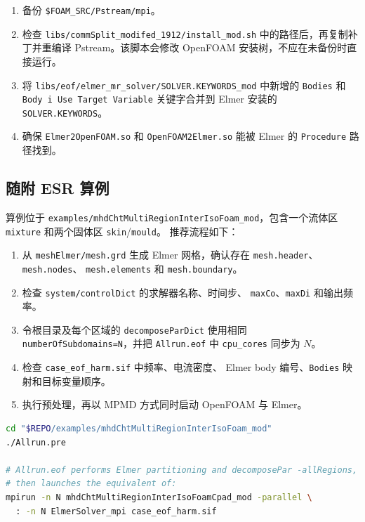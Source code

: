\documentclass[11pt,a4paper]{article}
\begin{document}
\begin{enumerate}
    \item 备份 \texttt{\$FOAM\_SRC/Pstream/mpi}。
    \item 检查 \texttt{libs/commSplit\_modifed\_1912/install\_mod.sh}
    中的路径后，再复制补丁并重编译 Pstream。该脚本会修改 OpenFOAM
    安装树，不应在未备份时直接运行。
    \item 将 \texttt{libs/eof/elmer\_mr\_solver/SOLVER.KEYWORDS\_mod}
    中新增的 \texttt{Bodies} 和
    \texttt{Body i Use Target Variable} 关键字合并到 Elmer 安装的
    \texttt{SOLVER.KEYWORDS}。
    \item 确保 \texttt{Elmer2OpenFOAM.so} 和
    \texttt{OpenFOAM2Elmer.so} 能被 Elmer 的
    \texttt{Procedure} 路径找到。
\end{enumerate}

\subsection{随附 ESR 算例}

算例位于
\texttt{examples/mhdChtMultiRegionInterIsoFoam\_mod}，包含一个流体区
\texttt{mixture} 和两个固体区 \texttt{skin}/\texttt{mould}。
推荐流程如下：

\begin{enumerate}
    \item 从 \texttt{meshElmer/mesh.grd} 生成 Elmer 网格，确认存在
    \texttt{mesh.header}、\texttt{mesh.nodes}、
    \texttt{mesh.elements} 和 \texttt{mesh.boundary}。
    \item 检查 \texttt{system/controlDict} 的求解器名称、时间步、
    \texttt{maxCo}、\texttt{maxDi} 和输出频率。
    \item 令根目录及每个区域的 \texttt{decomposeParDict} 使用相同
    \texttt{numberOfSubdomains=N}，并把 \texttt{Allrun.eof} 中
    \texttt{cpu\_cores} 同步为 $N$。
    \item 检查 \texttt{case\_eof\_harm.sif} 中频率、电流密度、
    Elmer body 编号、\texttt{Bodies} 映射和目标变量顺序。
    \item 执行预处理，再以 MPMD 方式同时启动 OpenFOAM 与 Elmer。
\end{enumerate}

\begin{lstlisting}[style=cppstyle, language=bash]
cd "$REPO/examples/mhdChtMultiRegionInterIsoFoam_mod"
./Allrun.pre

# Allrun.eof performs Elmer partitioning and decomposePar -allRegions,
# then launches the equivalent of:
mpirun -n N mhdChtMultiRegionInterIsoFoamCpad_mod -parallel \
  : -n N ElmerSolver_mpi case_eof_harm.sif
\end{lstlisting}
\end{document}
